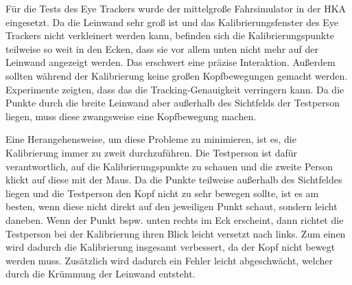 Für die Tests des Eye Trackers wurde der mittelgroße Fahrsimulator in der {\ac{HKA}} eingesetzt. Da die Leinwand sehr groß ist und das Kalibrierungsfenster des Eye Trackers nicht verkleinert werden kann, befinden sich die Kalibrierungspunkte teilweise so weit in den Ecken, dass sie vor allem unten nicht mehr auf der Leinwand angezeigt werden. Das erschwert eine präzise Interaktion. Außerdem sollten während der Kalibrierung keine großen Kopfbewegungen gemacht werden. Experimente zeigten, dass das die Tracking-Genauigkeit verringern kann. Da die Punkte durch die breite Leinwand aber außerhalb des Sichtfelds der Testperson liegen, muss diese zwangsweise eine Kopfbewegung machen. 

Eine Herangehensweise, um diese Probleme zu minimieren, ist es, die Kalibrierung immer zu zweit durchzuführen. Die Testperson ist dafür verantwortlich, auf die Kalibrierungspunkte zu schauen und die zweite Person klickt auf diese mit der Maus. Da die Punkte teilweise außerhalb des Sichtfeldes liegen und die Testperson den Kopf nicht zu sehr bewegen sollte, ist es am besten, wenn diese nicht direkt auf den jeweiligen Punkt schaut, sondern leicht daneben. Wenn der Punkt bspw. unten rechts im Eck erscheint, dann richtet die Testperson bei der Kalibrierung ihren Blick leicht versetzt nach links. Zum einen wird dadurch die Kalibrierung insgesamt verbessert, da der Kopf nicht bewegt werden muss. Zusätzlich wird dadurch ein Fehler leicht abgeschwächt, welcher durch die Krümmung der Leinwand entsteht.


